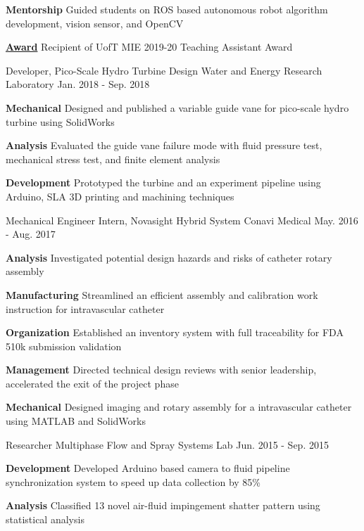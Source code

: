 \begin{cventries}
{\begin{cvitems}
{			}
			\item {
				\textbf{Mentorship} Guided students on ROS based autonomous robot algorithm development, vision sensor, and OpenCV
			}
			\item \textbf{\href{https://www.mie.utoronto.ca/congratulations-2019-20-teaching-assistant-award-winners-lap-tak-chu-richard-hu-behzad-khamidehi-ben-leung-and-khalil-sidawi/}{Award}} Recipient of UofT MIE 2019-20 Teaching Assistant Award
		\end{cvitems}
	}
	\cventry
	{Developer, Pico-Scale Hydro Turbine Design}
	{Water and Energy Research Laboratory}
	{Jan. 2018 - Sep. 2018}
	{}
	{
		\begin{cvitems}
			\item {\textbf{Mechanical} Designed and published a variable guide vane for pico-scale hydro turbine using SolidWorks}
			\item {\textbf{Analysis} Evaluated the guide vane failure mode with fluid pressure test, mechanical stress test, and finite element analysis}
			\item {\textbf{Development} Prototyped the turbine and an experiment pipeline using Arduino, SLA 3D printing and machining techniques}
		\end{cvitems}
	}
	\cventry
	{Mechanical Engineer Intern, Novasight Hybrid System}
	{Conavi Medical} 
	{May. 2016 - Aug. 2017}
	{}
	{
		\begin{cvitems}
			\item {
				\textbf{Analysis} Investigated potential design hazards and risks of catheter rotary assembly
			}
			\item {
				\textbf{Manufacturing} Streamlined an efficient assembly and calibration work instruction for intravascular catheter}
			\item {
				\textbf{Organization} Established an inventory system with full traceability for FDA 510k submission validation}
			\item {
				\textbf{Management} Directed technical design reviews with senior leadership, accelerated the exit of the project phase}
			\item {
				\textbf{Mechanical} Designed imaging and rotary assembly for a intravascular catheter using MATLAB and SolidWorks
			}
		\end{cvitems}
	}
	\cventry
	{Researcher}
	{Multiphase Flow and Spray Systems Lab} 
	{Jun. 2015 - Sep. 2015}
	{}
	{
		\begin{cvitems}
			\item {
				\textbf{Development} Developed Arduino based camera to fluid pipeline synchronization system to speed up data collection by 85\%
			}
			\item {
				\textbf{Analysis} Classified 13 novel air-fluid impingement shatter pattern using statistical analysis}
		\end{cvitems}
	}  
\end{cventries}
